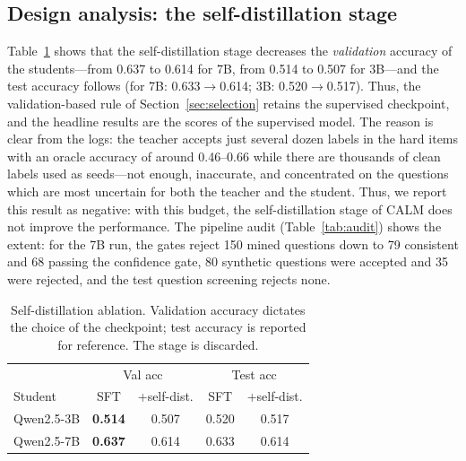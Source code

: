 \documentclass[conference]{IEEEtran}
\begin{document}
\subsection{Design analysis: the self-distillation stage}
Table~\ref{tab:abl} shows that the self-distillation stage decreases the \emph{validation} accuracy of the students---from 0.637 to 0.614 for 7B, from 0.514 to 0.507 for 3B---and the test accuracy follows (for 7B: 0.633$\to$0.614; 3B: 0.520$\to$0.517). Thus, the validation-based rule of Section~\ref{sec:selection} retains the supervised checkpoint, and the headline results are the scores of the supervised model. The reason is clear from the logs: the teacher accepts just several dozen labels in the hard items with an oracle accuracy of around 0.46--0.66 while there are thousands of clean labels used as seeds---not enough, inaccurate, and concentrated on the questions which are most uncertain for both the teacher and the student. Thus, we report this result as negative: with this budget, the self-distillation stage of CALM does not improve the performance. The pipeline audit (Table~\ref{tab:audit}) shows the extent: for the 7B run, the gates reject 150 mined questions down to 79 consistent and 68 passing the confidence gate, 80 synthetic questions were accepted and 35 were rejected, and the test question screening rejects none.

\begin{table}[tb]
\caption{Self-distillation ablation. Validation accuracy dictates the choice of the checkpoint; test accuracy is reported for reference. The stage is discarded.}\label{tab:abl}
\centering
\small
\setlength{\tabcolsep}{3.5pt}
\begin{tabular}{@{}lcccc@{}}
\toprule
 & \multicolumn{2}{c}{Val acc} & \multicolumn{2}{c}{Test acc} \\
Student & SFT & +self-dist. & SFT & +self-dist. \\
\midrule
Qwen2.5-3B & \textbf{0.514} & 0.507 & 0.520 & 0.517 \\
Qwen2.5-7B & \textbf{0.637} & 0.614 & 0.633 & 0.614 \\
\bottomrule
\end{tabular}
\end{table}
\end{document}
